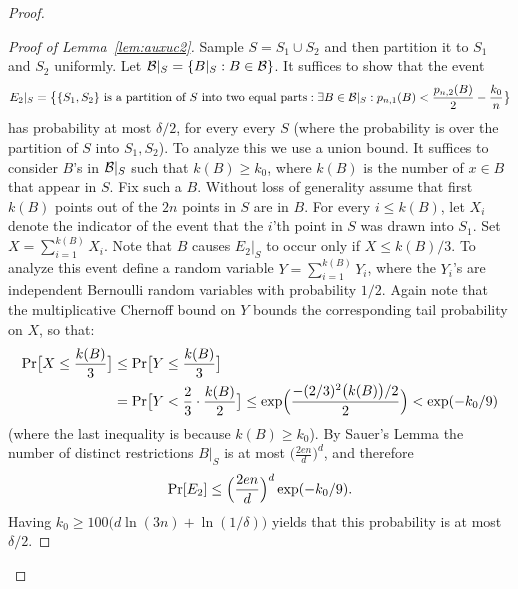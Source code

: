 \documentclass{article}
\newcommand{\B}{{\cal B}}
\newcommand{\new}[1]{\textcolor{red}{#1}}
\newcommand{\samp}{S}
\newcommand{\comment}[3]{\marginpar{\textcolor{#2}{#1: #3}}}
\newcommand{\shay}[1]{\comment{Shay}{red}{#1}}
\begin{document}
\begin{proof}
\begin{proof}[Proof of Lemma~\ref{lem:auxuc2}]
Sample $\samp=\samp_1\cup \samp_2$ and 
then partition it to $\samp_1$ and $\samp_2$ uniformly.
Let $\B|_{\samp} = \{B|_{\samp} : B\in\B\}$.
It suffices to show that the event
\[E_2|_{\samp} = 
\bigl\{ \{S_1,S_2\}\text{ is a partition of $S$ into two equal parts} :
\exists {B\in\B|_{\samp}}:
p_{n,1}(B) < \frac{p_{n,2}(B)}{2} - \frac{k_0}{n}
  \bigr\}
\]
has probability at most $\delta/2$, for every every $\samp$ 
(where the probability is over the partition of $\samp$ into $\samp_1,\samp_2$).
To analyze this we use a union bound. 
It suffices to consider $B$'s in $\B|_{\samp}$ such that $k(B) \geq k_0$,
where $k(B)$ is the number of $x\in B$ that appear in $S$.
Fix such a $B$.
Without loss of generality assume that
first $k(B)$ points out of the $2n$
points in $S$ are in $B$. 
For every $i\leq k(B)$,
let $X_i$ denote the indicator of the event
that the $i$'th point in $S$ was drawn into $S_1$.
Set~$X=\sum_{i=1}^{k(B)}X_i$.
Note that $B$ causes $E_2|_{\samp}$ to occur only if $X\leq k(B)/3$.
To analyze this event define a random variable $Y=\sum_{i=1}^{k(B)}Y_i$,
where the $Y_i$'s are independent Bernoulli random variables with probability $1/2$.
Again note that the multiplicative Chernoff bound on $Y$ bounds the corresponding tail probability on $X$, so that:
\shay{Here we should refer to the statement that sampling without repetitions is more concentrated.}
\begin{align*}
\Pr\bigl[X\leq \frac{k(B)}{3}\bigr]&\leq 
\Pr\bigl[Y\leq \frac{k(B)}{3}\bigr]\\
&=\Pr\bigl[Y < \frac{2}{3}\cdot\frac{k(B)}{2}\bigr]\leq
\exp\Bigl(\frac{-(2/3)^2\bigl(k(B)\bigr)/2}{2}\Bigr) < \exp(-k_0/9)
\end{align*}
(where the last inequality is because $k(B) \geq k_0$).
By Sauer's Lemma
the number of distinct restrictions $B|_S$ is at most $\bigl(\frac{2en}{d}\bigr)^d$, and therefore 
\[\Pr[E_2]\leq \Bigl(\frac{2en}{d}\Bigr)^d\exp(-k_0/9).\]
Having $k_0\geq 100\bigl(d\ln(3n) + \ln(1/\delta)\bigr)$ yields
that this probability is at most $\delta/2$.
\end{proof}
\end{proof}

%



\end{document}
